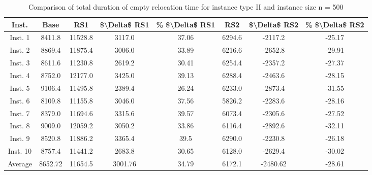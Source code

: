\begin{table}[H]
\centering
\begin{tabular}{cccccccc}
  \hline
  \textbf{Inst.} & \textbf{Base} & \textbf{RS1} & \textbf{\$\textbackslash{}Delta\$  RS1} & \textbf{\% \$\textbackslash{}Delta\$  RS1} & \textbf{RS2} & \textbf{\$\textbackslash{}Delta\$  RS2} & \textbf{\% \$\textbackslash{}Delta\$  RS2} \\\hline
  Inst. 1 & 8411.8 & 11528.8 & 3117.0 & 37.06 & 6294.6 & -2117.2 & -25.17 \\
  Inst. 2 & 8869.4 & 11875.4 & 3006.0 & 33.89 & 6216.6 & -2652.8 & -29.91 \\
  Inst. 3 & 8611.6 & 11230.8 & 2619.2 & 30.41 & 6254.4 & -2357.2 & -27.37 \\
  Inst. 4 & 8752.0 & 12177.0 & 3425.0 & 39.13 & 6288.4 & -2463.6 & -28.15 \\
  Inst. 5 & 9106.4 & 11495.8 & 2389.4 & 26.24 & 6233.0 & -2873.4 & -31.55 \\
  Inst. 6 & 8109.8 & 11155.8 & 3046.0 & 37.56 & 5826.2 & -2283.6 & -28.16 \\
  Inst. 7 & 8379.0 & 11694.6 & 3315.6 & 39.57 & 6073.4 & -2305.6 & -27.52 \\
  Inst. 8 & 9009.0 & 12059.2 & 3050.2 & 33.86 & 6116.4 & -2892.6 & -32.11 \\
  Inst. 9 & 8520.8 & 11886.2 & 3365.4 & 39.5 & 6290.0 & -2230.8 & -26.18 \\
  Inst. 10 & 8757.4 & 11441.2 & 2683.8 & 30.65 & 6128.0 & -2629.4 & -30.02 \\
  Average & 8652.72 & 11654.5 & 3001.76 & 34.79 & 6172.1 & -2480.62 & -28.61 \\\hline
\end{tabular}
\caption{Comparison of total duration of empty relocation time for instance type II and instance size n = 500}
\label{tab:wait:resrelocation-empty-relocation-comparison_II_500}
\end{table}
